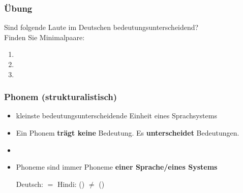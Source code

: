 \begin{frame}
	\frametitle{Übung}
	
Sind folgende Laute im Deutschen bedeutungsunterscheidend?\\
Finden Sie Minimalpaare:

\begin{enumerate}
	\item \textipa{[d]} \vs \textipa{[t]}
	
\medskip

	\item \textipa{[a]} \vs \textipa{[a:]}
	
\medskip

	\item \textipa{[z]} \vs \textipa{[s]}
\end{enumerate}


\end{frame}


\begin{frame}
\frametitle{Phonem (strukturalistisch)}

\begin{itemize}
	\item kleinste bedeutungsunterscheidende Einheit eines Sprachsystems
	\item Ein Phonem \textbf{trägt keine} Bedeutung. Es \textbf{unterscheidet} Bedeutungen.
	\item[]
	\item Phoneme sind immer Phoneme \textbf{einer Sprache/eines Systems}

	\eal
		\ex Deutsch: \textipa{[papa]} \textbf{$=$} 
		\ex Hindi: \textipa{[pal]} () \textbf{$\neq$} \textipa{[p\super{h}al]} ()
	\zl

\end{itemize}

\end{frame}


